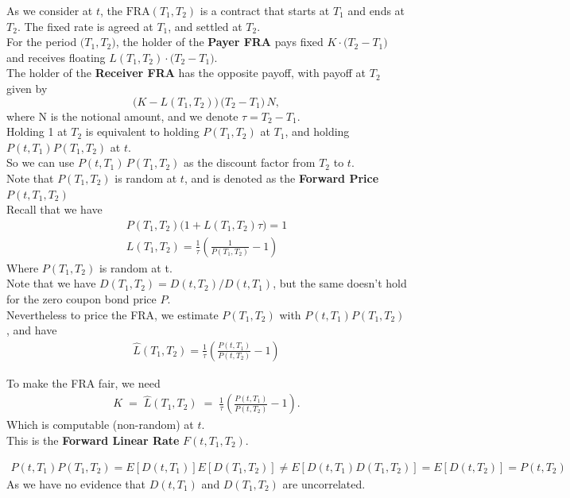     As we consider at \(t\), the \(\mathrm{FRA}(T_1, T_2)\) is a contract that starts at \(T_1\) and ends at \(T_2\). The fixed rate is agreed at \(T_1\), and settled at \(T_2\). \\
    For the period \(\bigl(T_1, T_2\bigr)\), the holder of the \textbf{Payer FRA} pays fixed \(K \cdot \bigl(T_2 - T_1\bigr)\) and receives floating \(L(T_1, T_2) \cdot \bigl(T_2 - T_1\bigr)\). \\
    The holder of the \textbf{Receiver FRA} has the opposite payoff, with payoff at \(T_2\) given by
    \[
       \bigl(K - L(T_1, T_2)\bigr)\,\bigl(T_2 - T_1\bigr)\,N,
    \]
    where N is the notional amount, and we denote \(\tau = T_2 - T_1\).\\
    Holding 1 at \(T_2\) is equivalent to holding \(P(T_1, T_2)\) at \(T_1\), 
    and holding \(P(t, T_1) P(T_1, T_2)\) at \(t\).\\
    So we can use \(P(t, T_1)\,P(T_1, T_2)\) as the discount factor from \(T_2\) to \(t\).\\
    Note that \(P(T_1, T_2)\) is random at \(t\), and is denoted as 
    the \textbf{Forward Price} \(P(t, T_1, T_2)\) \\
    Recall that we have
    \begin{align*}
        P(T_1, T_2) \bigg( 1 + L(T_1, T_2) \tau  \bigg) = 1 \\
        L(T_1, T_2) = \frac{1}{\tau} \left( \frac{1}{P(T_1, T_2)} - 1 \right) 
    \end{align*}
    Where $P(T_1, T_2)$ is random at t.\\
    Note that we have $D(T_1, T_2) = D(t, T_2) / D(t, T_1)$, but the same doesn't
    hold for the zero coupon bond price $P$. \\
    Nevertheless to price the FRA, we estimate $P(T_1, T_2)$ with $P(t, T_1) P(T_1, T_2)$,
    and have
    \begin{align*}
        \hat{L}(T_1, T_2)
        = \frac{1}{\tau} \left( \frac{P(t, T_1)}{P(t, T_2)} - 1 \right) 
    \end{align*}
    \begin{definition}
    To make the FRA fair, we need 
    \begin{align}
        K \;=\; \hat{L}(T_1, T_2) \;=\; \frac{1}{\tau} \left( \frac{P(t, T_1)}{P(t, T_2)} - 1 \right).
        \label{eq:forward_rate}
    \end{align}
    Which is computable (non-random) at \(t\).\\
    This is the \textbf{Forward Linear Rate} $ F(t, T_1, T_2) $.\\

    \begin{remark}
        \begin{align*}
            P(t, T_1) P(T_1, T_2) = E[D(t, T_1)] E[ D(T_1, T_2)] \neq
            E[D(t, T_1) D(T_1, T_2)] = E[D(t, T_2)] = P(t, T_2)
        \end{align*}
        As we have no evidence that $D(t, T_1)$ and $D(T_1, T_2)$ are uncorrelated.
    \end{remark}
    \end{definition}
